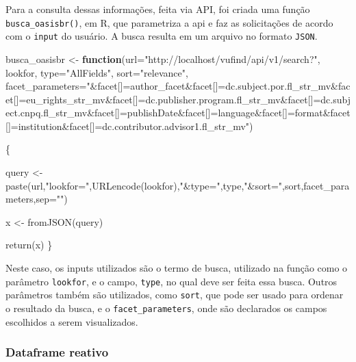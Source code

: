 \documentclass[
]{article}
\newenvironment{Shaded}{\begin{snugshade}}{\end{snugshade}}
\newcommand{\AttributeTok}[1]{\textcolor[rgb]{0.77,0.63,0.00}{#1}}
\newcommand{\ControlFlowTok}[1]{\textcolor[rgb]{0.13,0.29,0.53}{\textbf{#1}}}
\newcommand{\FunctionTok}[1]{\textcolor[rgb]{0.00,0.00,0.00}{#1}}
\newcommand{\NormalTok}[1]{#1}
\newcommand{\OtherTok}[1]{\textcolor[rgb]{0.56,0.35,0.01}{#1}}
\newcommand{\StringTok}[1]{\textcolor[rgb]{0.31,0.60,0.02}{#1}}
\begin{document}
Para a consulta dessas informações, feita via API, foi criada uma função
\texttt{busca\_oasisbr()}, em R, que parametriza a api e faz as
solicitações de acordo com o \texttt{input} do usuário. A busca resulta
em um arquivo no formato \texttt{JSON}.

\begin{Shaded}
\begin{Highlighting}[]
\NormalTok{busca\_oasisbr }\OtherTok{\textless{}{-}} \ControlFlowTok{function}\NormalTok{(}\AttributeTok{url=}\StringTok{"http://localhost/vufind/api/v1/search?"}\NormalTok{,}
\NormalTok{                          lookfor,}
                          \AttributeTok{type=}\StringTok{"AllFields"}\NormalTok{,}
                          \AttributeTok{sort=}\StringTok{"relevance"}\NormalTok{,}
                          \AttributeTok{facet\_parameters=}\StringTok{"\&facet[]=author\_facet\&facet[]=dc.subject.por.fl\_str\_mv\&facet[]=eu\_rights\_str\_mv\&facet[]=dc.publisher.program.fl\_str\_mv\&facet[]=dc.subject.cnpq.fl\_str\_mv\&facet[]=publishDate\&facet[]=language\&facet[]=format\&facet[]=institution\&facet[]=dc.contributor.advisor1.fl\_str\_mv"}\NormalTok{)}
                          
\NormalTok{  \{}
  
\NormalTok{  query }\OtherTok{\textless{}{-}} \FunctionTok{paste}\NormalTok{(url,}\StringTok{"lookfor="}\NormalTok{,}\FunctionTok{URLencode}\NormalTok{(lookfor),}\StringTok{"\&type="}\NormalTok{,type,}\StringTok{"\&sort="}\NormalTok{,sort,facet\_parameters,}\AttributeTok{sep=}\StringTok{""}\NormalTok{)}
  
\NormalTok{  x }\OtherTok{\textless{}{-}} \FunctionTok{fromJSON}\NormalTok{(query)}
  
  \FunctionTok{return}\NormalTok{(x)}
\NormalTok{\}}
\end{Highlighting}
\end{Shaded}

Neste caso, os inputs utilizados são o termo de busca, utilizado na
função como o parâmetro \texttt{lookfor}, e o campo, \texttt{type}, no
qual deve ser feita essa busca. Outros parâmetros também são utilizados,
como \texttt{sort}, que pode ser usado para ordenar o resultado da
busca, e o \texttt{facet\_parameters}, onde são declarados os campos
escolhidos a serem visualizados.

\hypertarget{dataframe-reativo}{%
\subsubsection{Dataframe reativo}\label{dataframe-reativo}}
\end{document}
